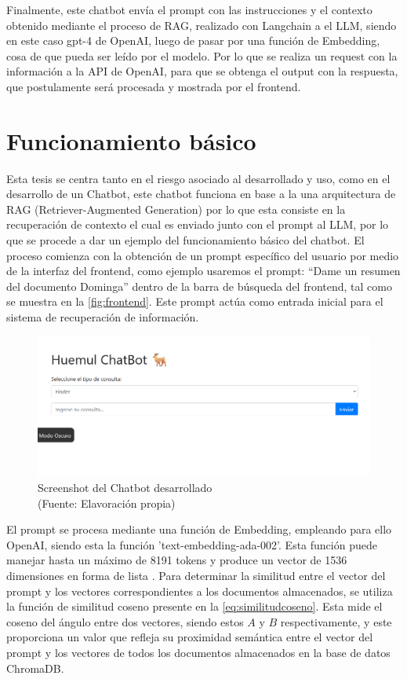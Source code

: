 Finalmente, este chatbot envía el prompt con las instrucciones y el contexto obtenido mediante el proceso de RAG, realizado con 
Langchain a el LLM, siendo en este caso gpt-4 de OpenAI, luego de pasar por una función de Embedding, cosa de que 
pueda ser leído por el modelo. Por lo que se realiza un request con la información a la API de OpenAI, para que se 
obtenga el output con la respuesta, que postulamente será procesada y mostrada por el frontend.

\newpage

\section{Funcionamiento básico}

Esta tesis se centra tanto en el riesgo asociado al desarrollado y uso, como en el desarrollo de un Chatbot, este chatbot funciona 
en base a la una arquitectura de RAG (Retriever-Augmented Generation) por lo que esta consiste en 
la recuperación de contexto el cual es enviado junto con el prompt al LLM, por lo que se procede a dar un ejemplo del funcionamiento básico del chatbot. El proceso comienza con 
la obtención de un prompt específico del usuario por medio de la interfaz del frontend, como ejemplo usaremos el prompt: ``Dame un resumen del documento Dominga'' 
dentro de la barra de búsqueda del frontend, tal como se muestra en la \autoref{fig:frontend}. Este prompt actúa como entrada inicial para el sistema de recuperación de información.

\begin{figure}[ht!]
    \centering
    \includegraphics[width=.9\textwidth]{figures/website.png}
    \caption[Screenshot del Chatbot desarrollado]{Screenshot del Chatbot desarrollado\\
    {\scriptsize (Fuente: Elavoración propia)}}
    \label{fig:frontend}
\end{figure}

El prompt se procesa mediante una función de Embedding, empleando para ello OpenAI, siendo esta  
la función 'text-embedding-ada-002'. Esta función puede manejar hasta un máximo de 8191 tokens y 
produce un vector de 1536 dimensiones en forma de lista \cite{openai1}. Para determinar la similitud entre el 
vector del prompt y los vectores correspondientes a los documentos almacenados, se utiliza la función 
de similitud coseno presente en la \autoref{eq:similitudcoseno}. Esta mide el coseno del ángulo entre dos vectores,
siendo estos $A$ y $B$ respectivamente, y este proporciona un valor que refleja su proximidad semántica entre el vector
del prompt y los vectores de todos los documentos almacenados en la base de datos ChromaDB.

